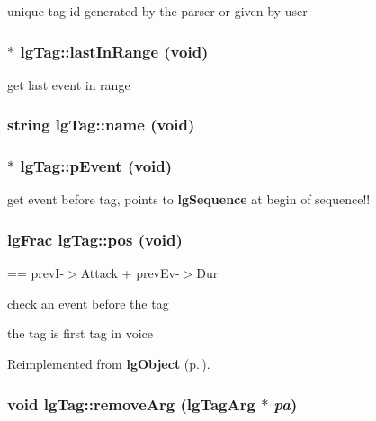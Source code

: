 unique tag id generated by the parser or given by user 

\subsubsection{ $\ast$ lg\-Tag::last\-In\-Range (void)}\label{classlgTag_a19}


get last event in range 

\subsubsection{\setlength{\rightskip}{0pt plus 5cm}string lg\-Tag::name (void)}\label{classlgTag_a6}


\subsubsection{$\ast$ lg\-Tag::p\-Event (void)\hspace{0.3cm}{\tt  [inline]}}\label{classlgTag_a17}


get event before tag, points to {\bf lg\-Sequence} at begin of sequence!! 

\subsubsection{\setlength{\rightskip}{0pt plus 5cm}lg\-Frac lg\-Tag::pos (void)\hspace{0.3cm}{\tt  [virtual]}}\label{classlgTag_a25}


== prev\-I-$>$Attack + prev\-Ev-$>$Dur 

check an event before the tag

the tag is first tag in voice 

Reimplemented from {\bf lg\-Object} {\rm (p.\,\pageref{classlgObject_a5})}.
\subsubsection{\setlength{\rightskip}{0pt plus 5cm}void lg\-Tag::remove\-Arg ({\bf lg\-Tag\-Arg} $\ast$ {\em pa})}\label{classlgTag_a16}


